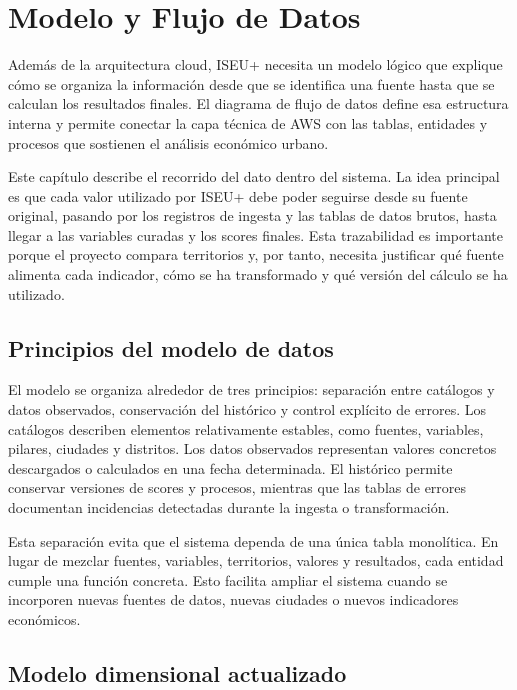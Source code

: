 \chapter{Modelo y Flujo de Datos}

Además de la arquitectura cloud, ISEU+ necesita un modelo lógico que explique cómo se organiza la información desde que se identifica una fuente hasta que se calculan los resultados finales. El diagrama de flujo de datos define esa estructura interna y permite conectar la capa técnica de AWS con las tablas, entidades y procesos que sostienen el análisis económico urbano.

Este capítulo describe el recorrido del dato dentro del sistema. La idea principal es que cada valor utilizado por ISEU+ debe poder seguirse desde su fuente original, pasando por los registros de ingesta y las tablas de datos brutos, hasta llegar a las variables curadas y los scores finales. Esta trazabilidad es importante porque el proyecto compara territorios y, por tanto, necesita justificar qué fuente alimenta cada indicador, cómo se ha transformado y qué versión del cálculo se ha utilizado.

\section{Principios del modelo de datos}

El modelo se organiza alrededor de tres principios: separación entre catálogos y datos observados, conservación del histórico y control explícito de errores. Los catálogos describen elementos relativamente estables, como fuentes, variables, pilares, ciudades y distritos. Los datos observados representan valores concretos descargados o calculados en una fecha determinada. El histórico permite conservar versiones de scores y procesos, mientras que las tablas de errores documentan incidencias detectadas durante la ingesta o transformación.

Esta separación evita que el sistema dependa de una única tabla monolítica. En lugar de mezclar fuentes, variables, territorios, valores y resultados, cada entidad cumple una función concreta. Esto facilita ampliar el sistema cuando se incorporen nuevas fuentes de datos, nuevas ciudades o nuevos indicadores económicos.

\section{Modelo dimensional actualizado}

